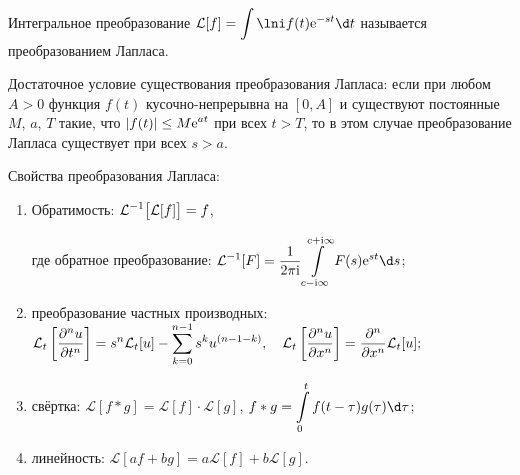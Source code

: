 
Интегральное преобразование \( \ds \mathcal{L}[f] = \int\lni f(t)\e^{-st}\d t \)
называется преобразованием Лапласа.

Достаточное условие существования преобразования Лапласа: если при любом
\( A > 0 \) функция \( f(t) \) кусочно-непрерывна на \( [0, A] \) и существуют
постоянные \( M \), \( a \), \( T \) такие, что \( \displaystyle |f(t)| \le M\mathrm{e}^{at} \)
при всех \( t > T \), то в этом случае преобразование Лапласа существует при
всех \( s > a \).

Свойства преобразования Лапласа:
\begin{enumerate}
    \item Обратимость: \( \displaystyle \mathcal{L}^{-1}\bigl[\mathcal{L}[f]\bigr] = f \),
    
    где обратное преобразование: \( \ds \mathcal{L}^{-1}[F] = \frac{1}{2\pi\i}
    \int\limits_{c-\i\infty}^{c+\i\infty} F(s)\e^{st}\d s \);
    
    \item преобразование частных производных:\\
    \(
        \displaystyle \mathcal{L}_t\left[\frac{\partial^{n} u}{\partial t^{n}}\right] = s^n\mathcal{L}_t[u] - 
            \sum\limits_{k=0}^{n-1} s^k u^{(n - 1 - k)},\quad 
        \displaystyle \mathcal{L}_t\left[\frac{\partial^{n} u}{\partial x^{n}}\right] =
            \frac{\partial^{n} }{\partial x^{n}}\mathcal{L}_t[u];
    \)
    
    \item свёртка: \( \mathcal{L}[f*g] = \mathcal{L}[f]\cdot \mathcal{L}[g] \),
    \( \ds f*g = \int\limits_0^t f(t-\tau)g(\tau)\d\tau \);
    
    \item линейность:
        \( \mathcal{L}[af + bg] = a\mathcal{L}[f] + b\mathcal{L}[g] \).
\end{enumerate}

